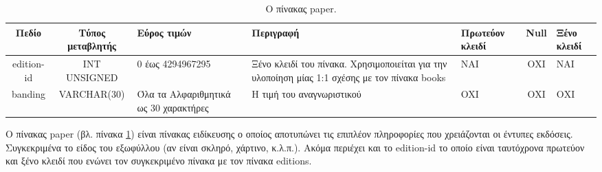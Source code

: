 \documentclass{assignment}
\begin{document}
\begin{landscape}
\begin{table}[htbp]
\begin{center}
  \begin{tabular}{|c|c|m{}|m{}|m{2.0cm}|c|m{1.5cm}|}
    \hline
    {\bf Πεδίο} & {\bf Τύπος μεταβλητής} & {\bf Εύρος τιμών} & {\bf Περιγραφή} & {\bf Πρωτεύον κλειδί} & {\bf Null} & {\bf Ξένο κλειδί} \\ \hline
    edition-id & INT UNSIGNED & 0 έως 4294967295 & Ξένο κλειδί του πίνακα. Χρησιμοποιείται για την υλοποίηση μίας 1:1 σχέσης με τον πίνακα books & ΝΑΙ & ΟΧΙ & NAI \\ \hline
    banding & VARCHAR(30) & Όλα τα Αλφαριθμητικά ως 30 χαρακτήρες & Η τιμή του αναγνωριστικού  & OXI & ΟΧΙ & ΟΧΙ \\ \hline
  \end{tabular}
\caption{Ο πίνακας paper.}
\label{table:db_table:paper}
\end{center}
\end{table}

Ο πίνακας paper (βλ. πίνακα \ref{table:db_table:paper}) είναι πίνακας ειδίκευσης ο οποίος αποτυπώνει τις επιπλέον πληροφορίες που χρειάζονται οι έντυπες εκδόσεις. Συγκεκριμένα το είδος του εξωφύλλου (αν είναι σκληρό, χάρτινο, κ.λ.π.). Ακόμα περιέχει και το edition-id το οποίο είναι ταυτόχρονα πρωτεύον και ξένο κλειδί που ενώνει τον συγκεκριμένο πίνακα με τον πίνακα editions.
\end{landscape}
\end{document}
